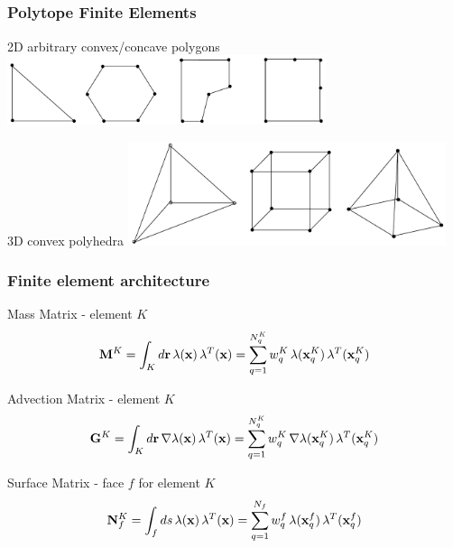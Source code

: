 \documentclass[compress,10pt]{beamer}
\renewcommand{\vec}[1]{\mathbf{#1}}
\begin{document}
\subsection{}
\begin{frame}[t]\frametitle{Polytope Finite Elements}
\centering
\begin{block}{2D arbitrary convex/concave polygons}
\centering
\includegraphics[width=0.70\textwidth]{images/arbitrary_polygons.png}
\end{block}
\vspace{0.5cm}
\begin{block}{3D convex polyhedra}
\centering
\includegraphics[width=0.70\textwidth]{images/arbitrary_polyhedra.png}
\end{block}
\end{frame}
\begin{frame}[t]\frametitle{Finite element architecture}
\begin{block}{Mass Matrix - element $K$}
\begin{equation*}
{\bf M}^K = \int_{K} d\vec{r} \, \lambda (\vec{x}) \, \lambda^T (\vec{x})  =  \sum\displaylimits_{q=1}^{N_q^K} w_q^K \, \lambda (\vec{x}_q^K) \, \lambda^T (\vec{x}_q^K) 
\end{equation*}
\end{block}
\begin{block}{Advection Matrix - element $K$}
\begin{equation*}
{\bf G}^K = \int_{K} d\vec{r} \, \vec{\nabla} \lambda (\vec{x}) \, \lambda^T (\vec{x}) = \sum\displaylimits_{q=1}^{N_q^K}  w_q^K \, \vec{\nabla} \lambda (\vec{x}_q^K) \, \lambda^T (\vec{x}_q^K) 
\end{equation*}
\end{block}
\begin{block}{Surface Matrix - face $f$ for element $K$}
\begin{equation*}
{\bf N}_f^K = \int_{f} ds \, \lambda (\vec{x}) \, \lambda^T (\vec{x})  = \sum\displaylimits_{q=1}^{N_f}  w_q^f \, \lambda (\vec{x}_q^f) \, \lambda^T (\vec{x}_q^f) 
\end{equation*}
\end{block}
\end{frame}
\end{document}

